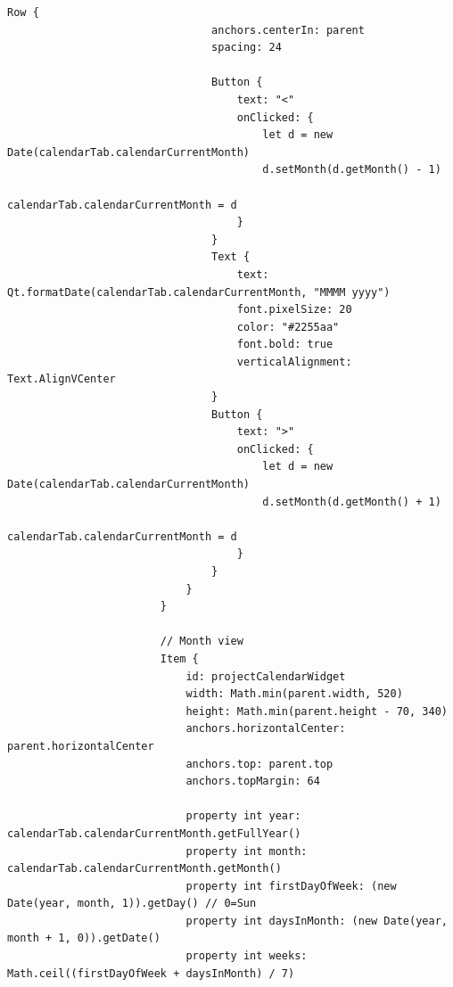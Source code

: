 \documentclass{report}
\begin{document}
\begin{lstlisting}[style=qmlstyle]
                            Row {
                                anchors.centerIn: parent
                                spacing: 24

                                Button {
                                    text: "<"
                                    onClicked: {
                                        let d = new Date(calendarTab.calendarCurrentMonth)
                                        d.setMonth(d.getMonth() - 1)
                                        calendarTab.calendarCurrentMonth = d
                                    }
                                }
                                Text {
                                    text: Qt.formatDate(calendarTab.calendarCurrentMonth, "MMMM yyyy")
                                    font.pixelSize: 20
                                    color: "#2255aa"
                                    font.bold: true
                                    verticalAlignment: Text.AlignVCenter
                                }
                                Button {
                                    text: ">"
                                    onClicked: {
                                        let d = new Date(calendarTab.calendarCurrentMonth)
                                        d.setMonth(d.getMonth() + 1)
                                        calendarTab.calendarCurrentMonth = d
                                    }
                                }
                            }
                        }

                        // Month view
                        Item {
                            id: projectCalendarWidget
                            width: Math.min(parent.width, 520)
                            height: Math.min(parent.height - 70, 340)
                            anchors.horizontalCenter: parent.horizontalCenter
                            anchors.top: parent.top
                            anchors.topMargin: 64

                            property int year: calendarTab.calendarCurrentMonth.getFullYear()
                            property int month: calendarTab.calendarCurrentMonth.getMonth()
                            property int firstDayOfWeek: (new Date(year, month, 1)).getDay() // 0=Sun
                            property int daysInMonth: (new Date(year, month + 1, 0)).getDate()
                            property int weeks: Math.ceil((firstDayOfWeek + daysInMonth) / 7)


\end{lstlisting}
\end{document}
